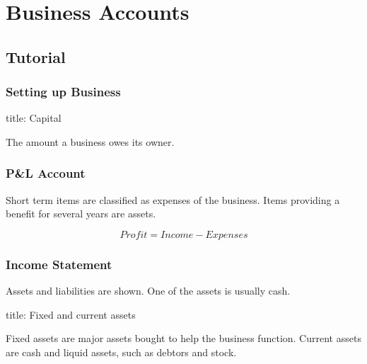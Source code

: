 \documentclass[
]{article}
\author{}
\date{}
\newenvironment{Shaded}{}{}
\newcommand{\NormalTok}[1]{#1}
\begin{document}
{
\setcounter{tocdepth}{3}
\tableofcontents
}
\hypertarget{business-accounts}{%
\section{Business Accounts}\label{business-accounts}}

\hypertarget{tutorial}{%
\subsection{Tutorial}\label{tutorial}}

\hypertarget{setting-up-business}{%
\subsubsection{Setting up Business}\label{setting-up-business}}

\begin{Shaded}
\begin{Highlighting}[]
\NormalTok{title: Capital}

\NormalTok{The amount a business owes its owner.}
\end{Highlighting}
\end{Shaded}

\hypertarget{pl-account}{%
\subsubsection{P\&L Account}\label{pl-account}}

Short term items are classified as expenses of the business. Items
providing a benefit for several years are assets.

\[Profit = Income - Expenses\]

\hypertarget{income-statement}{%
\subsubsection{Income Statement}\label{income-statement}}

Assets and liabilities are shown. One of the assets is usually cash.

\begin{Shaded}
\begin{Highlighting}[]
\NormalTok{title: Fixed and current assets}

\NormalTok{Fixed assets are major assets bought to help the business function. Current assets are cash and liquid assets, such as debtors and stock. }
\end{Highlighting}
\end{Shaded}
\end{document}
